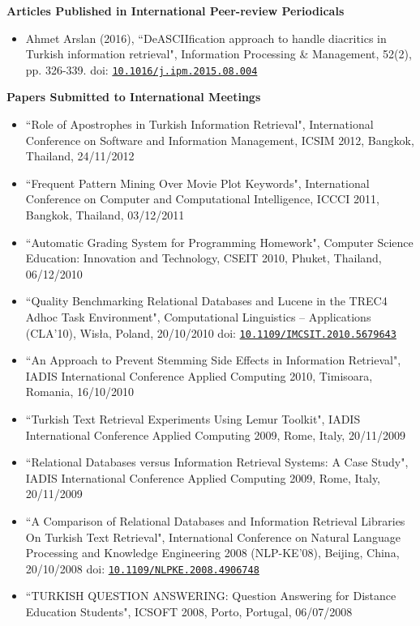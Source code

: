 \noindent 
\textbf{Articles Published in International Peer-review Periodicals}
\begin{itemize}
    \item Ahmet Arslan (2016), ``DeASCIIfication approach to handle diacritics in Turkish information retrieval", Information Processing \& Management, 52(2), pp. 326-339. doi: \href{http://dx.doi.org/10.1016/j.ipm.2015.08.004}{\texttt{10.1016/j.ipm.2015.08.004}}
\end{itemize}

\noindent 
\textbf{Papers Submitted to International Meetings}
\begin{itemize}

\item ``Role of Apostrophes in Turkish Information Retrieval", International Conference on Software and Information Management, ICSIM 2012, Bangkok, Thailand, 24/11/2012

\item ``Frequent Pattern Mining Over Movie Plot Keywords", International Conference on Computer and Computational Intelligence, ICCCI 2011, Bangkok, Thailand, 03/12/2011

\item ``Automatic Grading System for Programming Homework", Computer Science Education: Innovation and Technology, CSEIT 2010, Phuket, Thailand, 06/12/2010

\item ``Quality Benchmarking Relational Databases and Lucene in the TREC4 Adhoc Task Environment", Computational Linguistics -- Applications (CLA'10), Wis\l{}a, Poland, 20/10/2010 doi: \href{http://dx.doi.org/10.1109/IMCSIT.2010.5679643}{\texttt{10.1109/IMCSIT.2010.5679643}}

\item ``An Approach to Prevent Stemming Side Effects in Information Retrieval", IADIS International Conference Applied Computing 2010, Timisoara, Romania, 16/10/2010 

\item ``Turkish Text Retrieval Experiments Using Lemur Toolkit", IADIS International Conference Applied Computing 2009, Rome, Italy, 20/11/2009

\item ``Relational Databases versus Information Retrieval Systems: A Case Study", IADIS International Conference Applied Computing 2009, Rome, Italy, 20/11/2009

\item ``A Comparison of Relational Databases and Information Retrieval Libraries On Turkish Text Retrieval", International Conference on Natural Language Processing and Knowledge Engineering 2008 (NLP-KE'08), Beijing, China, 20/10/2008 doi: \href{http://dx.doi.org/10.1109/NLPKE.2008.4906748}{\texttt{10.1109/NLPKE.2008.4906748}} 

\item ``TURKISH QUESTION ANSWERING: Question Answering for Distance Education Students", ICSOFT 2008, Porto, Portugal, 06/07/2008
\end{itemize}